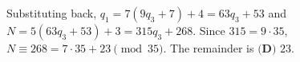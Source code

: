 Substituting back, $q_1=7(9q_3+7)+4=63q_3+53$ and $N=5(63q_3+53)+3=315q_3+268$. Since $315=9\cdot35$, $N\equiv268=7\cdot35+23\pmod{35}$. The remainder is $\boxed{\textbf{(D) } 23}$.
